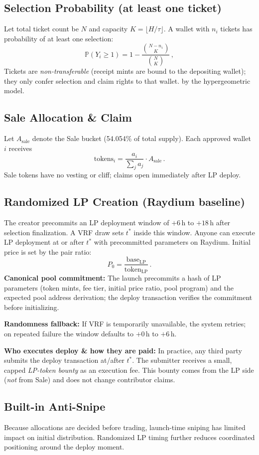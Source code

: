 \documentclass[10pt,twocolumn]{article}
\newcommand{\LPWinStart}{6}        %
\newcommand{\LPWinEnd}{18}         %
\newcommand{\LPFallbackEnd}{6}     %
\begin{document}
\subsection*{Selection Probability (at least one ticket)}
Let total ticket count be $N$ and capacity $K=\lfloor H/\tau \rfloor$. A wallet with $n_i$ tickets has probability of at least one selection:
\[
\mathbb{P}(Y_i \ge 1) = 1 - \frac{\binom{N - n_i}{K}}{\binom{N}{K}}\,, 
\]
Tickets are \emph{non-transferable} (receipt mints are bound to the depositing wallet); they only confer selection and claim rights to that wallet.
by the hypergeometric model.

\subsection*{Sale Allocation \& Claim}
Let $A_{\text{sale}}$ denote the Sale bucket (54.054\% of total supply). Each approved wallet $i$ receives
\[
\text{tokens}_i = \frac{a_i}{\sum_j a_j} \cdot A_{\text{sale}}\,.
\]
Sale tokens have no vesting or cliff; claims open immediately after LP deploy.

\subsection*{Randomized LP Creation (Raydium baseline)}
The creator precommits an LP deployment window of $+\LPWinStart$\,h to $+\LPWinEnd$\,h after selection finalization. A VRF draw sets $t^\ast$ inside this window. Anyone can execute LP deployment at or after $t^\ast$ with precommitted parameters on Raydium. Initial price is set by the pair ratio:
\[
P_0 = \frac{\text{base}_{\text{LP}}}{\text{token}_{\text{LP}}}\,.
\]
\textbf{Canonical pool commitment:} The launch precommits a hash of LP parameters (token mints, fee tier, initial price ratio, pool program) and the expected pool address derivation; the deploy transaction verifies the commitment before initializing.

\textbf{Randomness fallback:} If VRF is temporarily unavailable, the system retries; on repeated failure the window defaults to $+0$\,h to $+\LPFallbackEnd$\,h.

\textbf{Who executes deploy \& how they are paid:}
In practice, any third party submits the deploy transaction at/after $t^\ast$. The submitter receives a small, capped \emph{LP-token bounty} as an execution fee. This bounty comes from the LP side (\emph{not} from Sale) and does not change contributor claims.
 
\subsection*{Built-in Anti-Snipe}
Because allocations are decided before trading, launch-time sniping has limited impact on initial distribution. Randomized LP timing further reduces coordinated positioning around the deploy moment.
\end{document}
